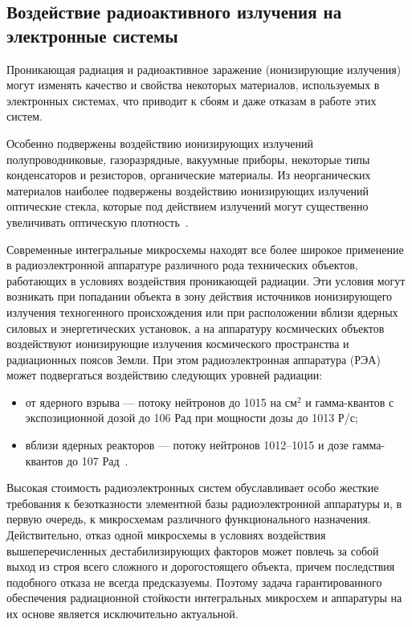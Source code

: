 \subsection{Воздействие радиоактивного излучения на электронные системы}

Проникающая радиация и радиоактивное заражение (ионизирующие излучения) могут изменять качество и свойства некоторых материалов, используемых в электронных системах, что приводит к сбоям и даже отказам в работе этих систем.

Особенно подвержены воздействию ионизирующих излучений полупроводниковые, газоразрядные, вакуумные приборы, некоторые типы конденсаторов и резисторов, органические материалы. Из неорганических материалов наиболее подвержены воздействию ионизирующих излучений оптические стекла, которые под действием излучений могут существенно увеличивать оптическую плотность~\cite{econ1}.

Современные интегральные микросхемы находят все более широкое применение в радиоэлектронной аппаратуре различного рода технических объектов, работающих в условиях воздействия проникающей радиации. Эти условия могут возникать при попадании объекта в зону действия источников ионизирующего излучения техногенного происхождения или при расположении вблизи ядерных силовых и энергетических установок, а на аппаратуру космических объектов воздействуют ионизирующие излучения космического пространства и радиационных поясов Земли. При этом радиоэлектронная аппаратура (РЭА) может подвергаться воздействию следующих уровней радиации:

\begin{itemize}
    \item от ядерного взрыва --- потоку нейтронов до 1015 на $\textrm{см}^2$ и гамма-квантов с экспозиционной дозой до 106 Рад при мощности дозы до 1013 Р/с;
    \item вблизи ядерных реакторов --- потоку нейтронов 1012--1015 и дозе гамма-квантов до 107 Рад~\cite{econ1}.
\end{itemize}

Высокая стоимость радиоэлектронных систем обуславливает особо жесткие требования к безотказности элементной базы радиоэлектронной аппаратуры и, в первую очередь, к микросхемам различного функционального назначения. Действительно, отказ одной микросхемы в условиях воздействия вышеперечисленных дестабилизирующих факторов может повлечь за собой выход из строя всего сложного и дорогостоящего объекта, причем последствия подобного отказа не всегда предсказуемы. Поэтому задача гарантированного обеспечения радиационной стойкости интегральных микросхем и аппаратуры на их основе является исключительно актуальной.


